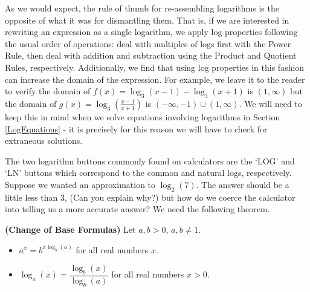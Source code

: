 As we would expect, the rule of thumb for re-assembling logarithms is the opposite of what it was for dismantling them.  That is, if we are interested in rewriting an expression as a single logarithm, we apply log properties following the usual order of operations:  deal with multiples of logs first with the Power Rule, then deal with addition and subtraction using the Product and Quotient Rules, respectively. Additionally, we find that using log properties in this fashion can increase the domain of the expression.  For example, we leave it to the reader to verify the domain of $f(x) = \log_{3}(x-1) - \log_{3}(x+1)$ is $(1,\infty)$ but the domain of $g(x) = \log_{3}\left(\frac{x-1}{x+1}\right)$ is $(-\infty, -1) \cup (1, \infty)$.  We will need to keep this in mind when we solve equations involving logarithms in Section \ref{LogEquations} - it is precisely for this reason we will have to check for extraneous solutions.

\smallskip

The two logarithm buttons commonly found on calculators are the `LOG' and `LN' buttons which correspond to the common and natural logs, respectively.  Suppose we wanted an approximation to $\log_{2}(7)$.  The answer should be a little less than $3$, (Can you explain why?) but how do we coerce the calculator into telling us a more accurate answer?  We need the following theorem.

\smallskip

\colorbox{ResultColor}{\bbm

\begin{thm} \label{changeofbase} \textbf{(Change of Base Formulas)} Let $a,b >0$, $a,b \neq 1$.   

\begin{itemize}

\item  $a^{x} = b^{x \log_{b}(a)}$ for all real numbers $x$.

\item  $\log_{a}(x) = \dfrac{\log_{b}(x)}{\log_{b}(a)}$ for all real numbers $x > 0$.

\end{itemize}

\end{thm}

\ebm}

\smallskip

